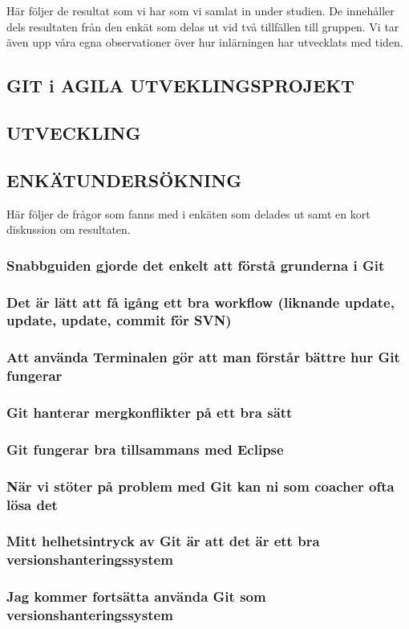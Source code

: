 Här följer de resultat som vi har som vi samlat in under studien. De innehåller dels resultaten från den enkät som delas ut vid två tillfällen till gruppen. Vi tar även upp våra egna observationer över hur inlärningen har utvecklats med tiden. 

\subsection{GIT i AGILA UTVEKLINGSPROJEKT}
\subsection{UTVECKLING}
\subsection{ENKÄTUNDERSÖKNING}
Här följer de frågor som fanns med i enkäten som delades ut samt en kort diskussion om resultaten.

\subsubsection{Snabbguiden gjorde det enkelt att förstå grunderna i Git}

\subsubsection{Det är lätt att få igång ett bra workflow (liknande update, update, update, commit för SVN)}


\subsubsection{Att använda Terminalen gör att man förstår bättre hur Git fungerar}


\subsubsection{Git hanterar mergkonflikter på ett bra sätt}


\subsubsection{Git fungerar bra tillsammans med Eclipse}


\subsubsection{När vi stöter på problem med Git kan ni som coacher ofta lösa det}


\subsubsection{Mitt helhetsintryck av Git är att det är ett bra versionshanteringssystem}


\subsubsection{Jag kommer fortsätta använda Git som versionshanteringssystem}
